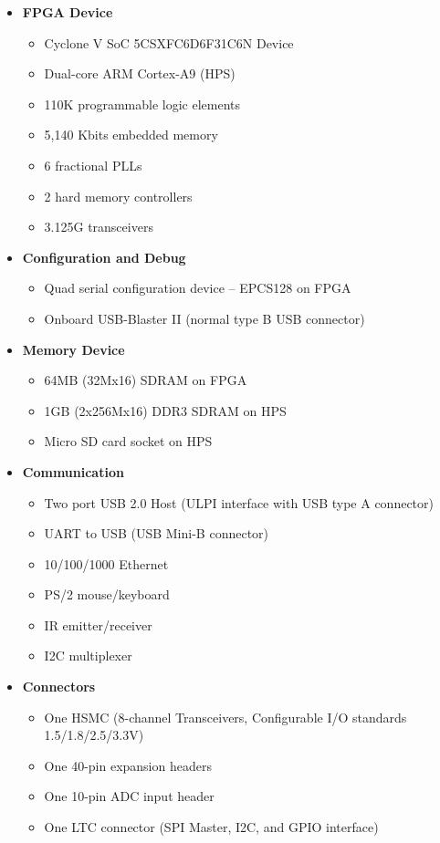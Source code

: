 \begin{itemize}[label=-]
	\item \textbf{FPGA Device}
	\begin{itemize}[label=+]
		\item Cyclone V SoC 5CSXFC6D6F31C6N Device
		\item Dual-core ARM Cortex-A9 (HPS)
		\item 110K programmable logic elements
		\item 5,140 Kbits embedded memory
		\item 6 fractional PLLs
		\item 2 hard memory controllers
		\item 3.125G transceivers
	\end{itemize}
	
	\item \textbf{Configuration and Debug}
	\begin{itemize}[label=+]
		\item Quad serial configuration device – EPCS128 on FPGA
		\item Onboard USB-Blaster II (normal type B USB connector)
	\end{itemize}
	
	\item \textbf{Memory Device}
	\begin{itemize}[label=+]
		\item 64MB (32Mx16) SDRAM on FPGA
		\item 1GB (2x256Mx16) DDR3 SDRAM on HPS
		\item Micro SD card socket on HPS
	\end{itemize}
	
	\item \textbf{Communication}
	\begin{itemize}[label=+]
		\item Two port USB 2.0 Host (ULPI interface with USB type A connector)
		\item UART to USB (USB Mini-B connector)
		\item 10/100/1000 Ethernet
		\item PS/2 mouse/keyboard
		\item IR emitter/receiver
		\item I2C multiplexer
	\end{itemize}
	
	\item \textbf{Connectors}
	\begin{itemize}[label=+]
		\item One HSMC (8-channel Transceivers, Configurable I/O standards 1.5/1.8/2.5/3.3V)
		\item One 40-pin expansion headers
		\item One 10-pin ADC input header
		\item One LTC connector (SPI Master, I2C, and GPIO interface)
	\end{itemize}
	

\end{itemize}

